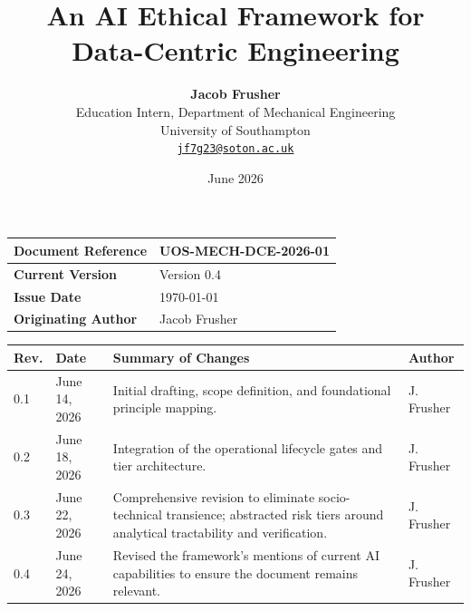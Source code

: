 ﻿\documentclass[11pt,a4paper]{article}
\title{
    \vspace{-1.5cm}
    \Huge\bfseries An AI Ethical Framework for Data-Centric Engineering \\
}
\author{
    \textbf{Jacob Frusher} \\
    \small Education Intern, Department of Mechanical Engineering \\
    \small University of Southampton \\
    \small\href{mailto:jf7g23@soton.ac.uk}{\texttt{jf7g23@soton.ac.uk}}
}
\date{\small June 2026}
\newif\ifdraft
\begin{document}


\maketitle

\begin{table}[H]
\centering
\small
\label{tab:doc_control}
\vspace{2mm}
\begin{tabularx}{\textwidth}{| l | X |}
\hline
\textbf{Document Reference} & UOS-MECH-DCE-2026-01 \\ \hline
\textbf{Current Version} & Version 0.4 \\ \hline
\textbf{Issue Date} & \today \\ \hline
\textbf{Originating Author} & Jacob Frusher \\ \hline
\end{tabularx}

\vspace{4mm}

\begin{tabularx}{\textwidth}{| l | l | X | l |}
\hline
\textbf{Rev.} & \textbf{Date} & \textbf{Summary of Changes} & \textbf{Author} \\ \hline
0.1 & June 14, 2026 & Initial drafting, scope definition, and foundational principle mapping. & J. Frusher \\ \hline
0.2 & June 18, 2026 & Integration of the operational lifecycle gates and tier architecture. & J. Frusher \\ \hline
0.3 & June 22, 2026 & Comprehensive revision to eliminate socio-technical transience; abstracted risk tiers around analytical tractability and verification. & J. Frusher \\ \hline
0.4 & June 24, 2026 & Revised the framework's mentions of current AI capabilities to ensure the document remains relevant. & J. Frusher \\ \hline
\end{tabularx}
\end{table}
\end{document}
